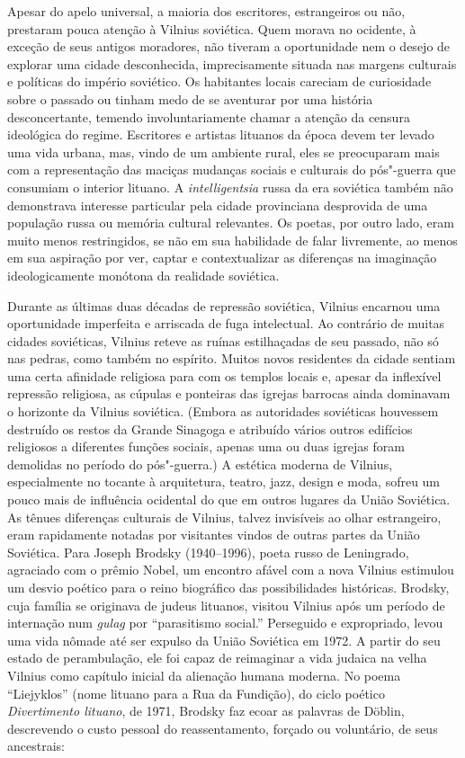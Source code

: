 Apesar do apelo universal, a maioria dos escritores, estrangeiros ou
não, prestaram pouca atenção à Vilnius soviética. Quem morava no
ocidente, à exceção de seus antigos moradores, não tiveram a
oportunidade nem o desejo de explorar uma cidade desconhecida,
imprecisamente situada nas margens culturais e políticas do império
soviético. Os habitantes locais careciam de curiosidade sobre o passado
ou tinham medo de se aventurar por uma história desconcertante, temendo
involuntariamente chamar a atenção da censura ideológica do regime.
Escritores e artistas lituanos da época devem ter levado uma vida
urbana, mas, vindo de um ambiente rural, eles se preocuparam mais com a
representação das maciças mudanças sociais e culturais do pós"-guerra que
consumiam o interior lituano. A \textit{intelligentsia} russa da era
soviética também não demonstrava interesse particular pela cidade
provinciana desprovida de uma população russa ou memória cultural
relevantes. Os poetas, por outro lado, eram muito menos restringidos, se
não em sua habilidade de falar livremente, ao menos em sua aspiração por
ver, captar e contextualizar as diferenças na imaginação ideologicamente
monótona da realidade soviética.

Durante as últimas duas décadas de repressão soviética, Vilnius encarnou
uma oportunidade imperfeita e arriscada de fuga intelectual. Ao
contrário de muitas cidades soviéticas, Vilnius reteve as ruínas
estilhaçadas de seu passado, não só nas pedras, como também no espírito.
Muitos novos residentes da cidade sentiam uma certa afinidade religiosa
para com os templos locais e, apesar da inflexível repressão religiosa,
as cúpulas e ponteiras das igrejas barrocas ainda dominavam o horizonte
da Vilnius soviética. (Embora as autoridades soviéticas houvessem
destruído os restos da Grande Sinagoga e atribuído vários outros
edifícios religiosos a diferentes funções sociais, apenas uma ou duas
igrejas foram demolidas no período do pós"-guerra.) A estética moderna de
Vilnius, especialmente no tocante à arquitetura, teatro, jazz, design e
moda, sofreu um pouco mais de influência ocidental do que em outros
lugares da União Soviética. As tênues diferenças culturais de Vilnius,
talvez invisíveis ao olhar estrangeiro, eram rapidamente notadas por
visitantes vindos de outras partes da União Soviética. Para Joseph
Brodsky (1940--1996), poeta russo de Leningrado, agraciado com o prêmio
Nobel, um encontro afável com a nova Vilnius estimulou um desvio poético
para o reino biográfico das possibilidades históricas. Brodsky, cuja
família se originava de judeus lituanos, visitou Vilnius após um período
de internação num \textit{gulag} por ``parasitismo social.'' Perseguido e
expropriado, levou uma vida nômade até ser expulso da União Soviética em
1972. A partir do seu estado de perambulação, ele foi capaz de
reimaginar a vida judaica na velha Vilnius como capítulo inicial da
alienação humana moderna. No poema ``Liejyklos'' (nome lituano para a
Rua da Fundição), do ciclo poético \textit{Divertimento lituano}, de 1971,
Brodsky faz ecoar as palavras de Döblin, descrevendo o custo pessoal do
reassentamento, forçado ou voluntário, de seus ancestrais:

